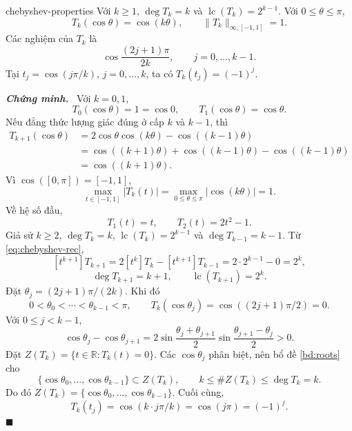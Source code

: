\documentclass[12pt,a4paper,oneside]{book}
\numberwithin{algorithm}{chapter}
\theoremstyle{definition}
\newenvironment{chungminh}{\par\medskip\noindent\textbf{\textit{\color{mainblue}Chứng minh.}}\ }{\hfill$\blacksquare$\par\medskip}
\newcommand{\R}{\mathbb{R}}
\newcommand{\lc}{\operatorname{lc}}
\begin{document}
\begin{menhde}{}{chebyshev-properties}
Với $k\geq1$, $\deg T_k=k$ và $\lc(T_k)=2^{k-1}$. Với $0\leq\theta\leq\pi$,
\[
 T_k(\cos\theta)=\cos(k\theta),\qquad
 \lVert T_k\rVert_{\infty,[-1,1]}=1.
\]
Các nghiệm của $T_k$ là
\[
 \cos\frac{(2j+1)\pi}{2k},\qquad j=0,\ldots,k-1.
\]
Tại $t_j=\cos(j\pi/k)$, $j=0,\ldots,k$, ta có $T_k(t_j)=(-1)^j$.
\end{menhde}
\begin{chungminh}
Với $k=0,1$,
\[
 T_0(\cos\theta)=1=\cos0,\qquad T_1(\cos\theta)=\cos\theta.
\]
Nếu đẳng thức lượng giác đúng ở cấp $k$ và $k-1$, thì
\begin{align*}
 T_{k+1}(\cos\theta)
 &=2\cos\theta\cos(k\theta)-\cos((k-1)\theta)\\
 &=\cos((k+1)\theta)+\cos((k-1)\theta)-\cos((k-1)\theta)\\
 &=\cos((k+1)\theta).
\end{align*}
Vì $\cos([0,\pi])=[-1,1]$,
\[
 \max_{t\in[-1,1]}|T_k(t)|
 =\max_{0\leq\theta\leq\pi}|\cos(k\theta)|=1.
\]
Về hệ số đầu,
\[
 T_1(t)=t,\qquad T_2(t)=2t^2-1.
\]
Giả sử $k\geq2$, $\deg T_k=k$, $\lc(T_k)=2^{k-1}$ và $\deg T_{k-1}=k-1$. Từ \eqref{eq:chebyshev-rec},
\[
 [t^{k+1}]T_{k+1}=2[t^k]T_k-[t^{k+1}]T_{k-1}
 =2\cdot2^{k-1}-0=2^k,
\]
\[
 \deg T_{k+1}=k+1,\qquad\lc(T_{k+1})=2^k.
\]
Đặt $\theta_j=(2j+1)\pi/(2k)$. Khi đó
\[
 0<\theta_0<\cdots<\theta_{k-1}<\pi,
 \qquad T_k(\cos\theta_j)=\cos((2j+1)\pi/2)=0.
\]
Với $0\leq j<k-1$,
\[
 \cos\theta_j-\cos\theta_{j+1}
 =2\sin\frac{\theta_j+\theta_{j+1}}2
   \sin\frac{\theta_{j+1}-\theta_j}2>0.
\]
Đặt $Z(T_k)=\{t\in\R:T_k(t)=0\}$. Các $\cos\theta_j$ phân biệt, nên bổ đề \ref{bd:roots} cho
\[
 \{\cos\theta_0,\ldots,\cos\theta_{k-1}\}\subset Z(T_k),
 \qquad k\leq\#Z(T_k)\leq\deg T_k=k.
\]
Do đó $Z(T_k)=\{\cos\theta_0,\ldots,\cos\theta_{k-1}\}$. Cuối cùng,
\[
 T_k(t_j)=\cos(k\cdot j\pi/k)=\cos(j\pi)=(-1)^j.
\]
\end{chungminh}
\end{document}
